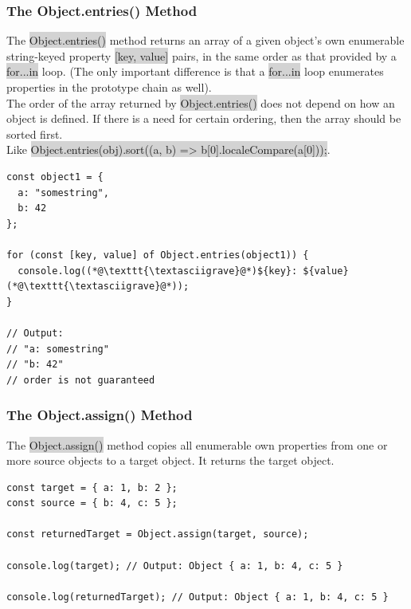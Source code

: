\documentclass[11pt]{article}
\begin{document}
\subsubsection{The Object.entries() Method}
The \colorbox{lightgray}{Object.entries()} method returns an array of a given object's own enumerable string-keyed property \colorbox{lightgray}{[key, value]} pairs, in the same order as that provided by a \colorbox{lightgray}{for...in} loop. (The only important difference is that a \colorbox{lightgray}{for...in} loop enumerates properties in the prototype chain as well). \\
\newline 
The order of the array returned by \colorbox{lightgray}{Object.entries()} does not depend on how an object is defined. If there is a need for certain ordering, then the array should be sorted first. \\ Like \colorbox{lightgray}{Object.entries(obj).sort((a, b) => b[0].localeCompare(a[0]));}.
\begin{lstlisting}
const object1 = {
  a: "somestring",
  b: 42
};

for (const [key, value] of Object.entries(object1)) {
  console.log((*@\texttt{\textasciigrave}@*)${key}: ${value}(*@\texttt{\textasciigrave}@*));
}

// Output:
// "a: somestring"
// "b: 42"
// order is not guaranteed
\end{lstlisting}

\subsubsection{The Object.assign() Method}
The \colorbox{lightgray}{Object.assign()} method copies all enumerable own properties from one or more source objects to a target object. It returns the target object.
\begin{lstlisting}
const target = { a: 1, b: 2 };
const source = { b: 4, c: 5 };

const returnedTarget = Object.assign(target, source);

console.log(target); // Output: Object { a: 1, b: 4, c: 5 }

console.log(returnedTarget); // Output: Object { a: 1, b: 4, c: 5 }
\end{lstlisting}
\end{document}
